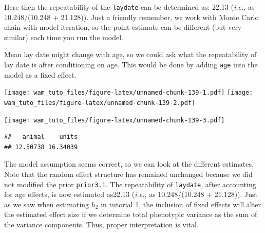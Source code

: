 \documentclass[
  12pt,
]{book}
\newenvironment{Shaded}{\begin{snugshade}}{\end{snugshade}}
\newcommand{\DataTypeTok}[1]{\textcolor[rgb]{0.13,0.29,0.53}{#1}}
\newcommand{\FloatTok}[1]{\textcolor[rgb]{0.00,0.00,0.81}{#1}}
\newcommand{\KeywordTok}[1]{\textcolor[rgb]{0.13,0.29,0.53}{\textbf{#1}}}
\newcommand{\NormalTok}[1]{#1}
\newcommand{\OperatorTok}[1]{\textcolor[rgb]{0.81,0.36,0.00}{\textbf{#1}}}
\newcommand{\OtherTok}[1]{\textcolor[rgb]{0.56,0.35,0.01}{#1}}
\newcommand{\StringTok}[1]{\textcolor[rgb]{0.31,0.60,0.02}{#1}}
\begin{document}
Here then the repeatability of the \texttt{laydate} can be determined as: 22.13 (\emph{i.e.}, as 10.248/(10.248 + 21.128)). Just a friendly remember, we work with Monte Carlo chain with model iteration, so the point estimate can be different (but very similar) each time you run the model.

Mean lay date might change with age, so we could ask what the repeatability of lay date is after conditioning on age. This would be done by adding \texttt{age} into the model as a fixed effect.

\begin{Shaded}
\end{Shaded}

\texttt{[image: wam\_tuto\_files/figure-latex/unnamed-chunk-139-1.pdf]} \texttt{[image: wam\_tuto\_files/figure-latex/unnamed-chunk-139-2.pdf]}

\begin{Shaded}
\end{Shaded}

\texttt{[image: wam\_tuto\_files/figure-latex/unnamed-chunk-139-3.pdf]}

\begin{Shaded}
\end{Shaded}

\begin{verbatim}
##   animal    units 
## 12.50738 16.34039
\end{verbatim}

The model assumption seems correct, so we can look at the different estimates.
Note that the random effect structure has remained unchanged because we did not modified the prior \texttt{prior3.1}.
The repeatability of \texttt{laydate}, after accounting for age effects, is now estimated as22.13 (\emph{i.e.}, as 10.248/(10.248 + 21.128)).
Just as we saw when estimating \(h_2\) in tutorial 1, the inclusion of fixed effects will alter the estimated effect size if we determine total phenotypic variance as the sum of the variance components. Thus, proper interpretation is vital.
\end{document}
